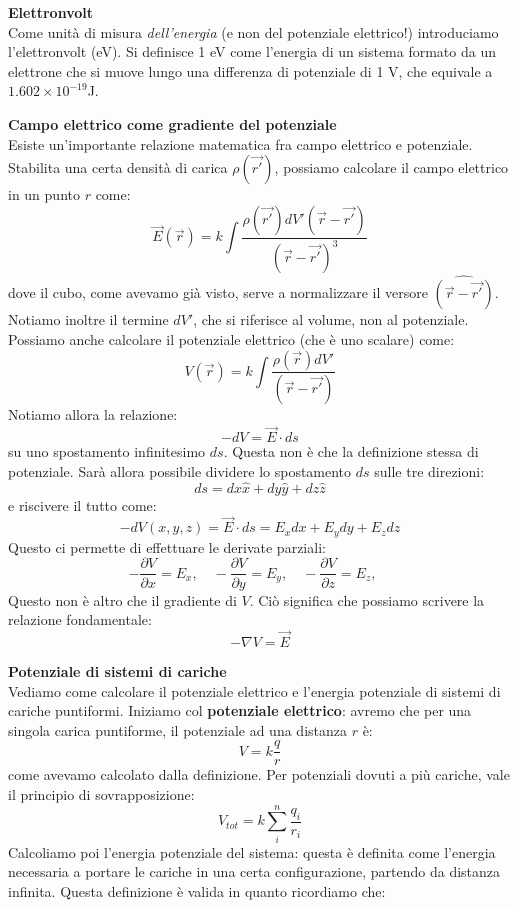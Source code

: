 \documentclass[a4paper,12pt]{article}
\begin{document}
\par\smallskip
\textbf{Elettronvolt} \\
Come unità di misura \textit{dell'energia} (e non del potenziale elettrico!) introduciamo l'elettronvolt (eV). Si definisce 1 eV come l'energia di un sistema formato da un elettrone che si muove lungo una differenza di potenziale
di 1 V, che equivale a $1.602 \times 10^{-19}$J.
\par\smallskip
\textbf{Campo elettrico come gradiente del potenziale} \\
Esiste un'importante relazione matematica fra campo elettrico e potenziale. Stabilita una certa densità di carica $\rho(\vec{r'})$, possiamo calcolare il campo elettrico in un punto $r$ come:
$$ \vec{E}(\vec{r}) = k\int \frac{\rho{(\vec{r'})}dV'(\vec{r}-\vec{r'})}{(\vec{r}-\vec{r'})^3} $$
dove il cubo, come avevamo già visto, serve a normalizzare il versore $\hat{(\vec{r}-\vec{r'})}$. Notiamo inoltre il termine $dV'$, che si riferisce al volume, non al potenziale. Possiamo anche calcolare
il potenziale elettrico (che è uno scalare) come:
$$ V(\vec{r}) = k\int \frac{\rho(\vec{r})dV'}{(\vec{r}-\vec{r'})} $$
Notiamo allora la relazione:
$$ -dV = \vec{E} \cdot ds $$
su uno spostamento infinitesimo $ds$. Questa non è che la definizione stessa di potenziale. Sarà allora possibile dividere lo spostamento $ds$ sulle tre direzioni:
$$ ds = dx \hat{x} + dy \hat{y} + dz \hat{z} $$
e riscivere il tutto come:
$$ -dV(x,y,z) = \vec{E} \cdot ds = E_xdx + E_ydy + E_zdz $$
Questo ci permette di effettuare le derivate parziali:
$$ -\frac{\partial V}{\partial x} = E_x, \quad -\frac{\partial V}{\partial y} = E_y, \quad -\frac{\partial V}{\partial z} = E_z, \quad $$
Questo non è altro che il gradiente di $V$. Ciò significa che possiamo scrivere la relazione fondamentale:
$$ -\nabla V = \vec{E} $$
\par\smallskip
\textbf{Potenziale di sistemi di cariche} \\
Vediamo come calcolare il potenziale elettrico e l'energia potenziale di sistemi di cariche puntiformi. Iniziamo col \textbf{potenziale elettrico}: avremo che per una singola carica puntiforme, il potenziale ad una distanza $r$ è:
$$ V = k \frac{q}{r} $$
come avevamo calcolato dalla definizione. Per potenziali dovuti a più cariche, vale il principio di sovrapposizione:
$$ V_{tot} = k \sum_i^n \frac{q_i}{r_i} $$
Calcoliamo poi l'energia potenziale del sistema: questa è definita come l'energia necessaria a portare le cariche in una certa configurazione, partendo da distanza infinita. Questa definizione è valida in quanto ricordiamo che:
\end{document}
